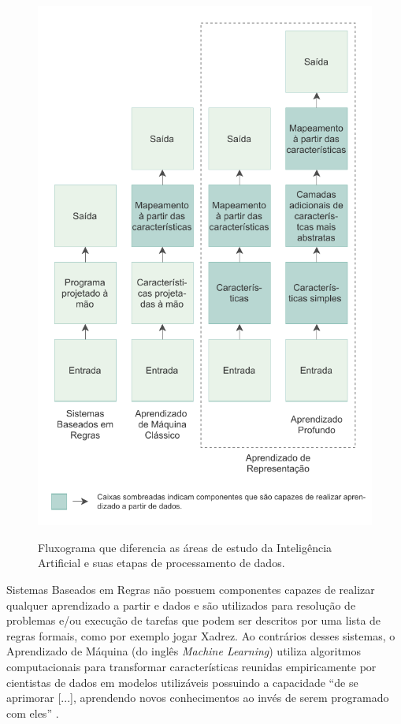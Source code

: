 \begin{figure}[h!] %
  \centering
  \caption{Fluxograma que diferencia as áreas de estudo da Inteligência Artificial e suas etapas de processamento de dados. }
  \includegraphics[scale=1.1]{img/img-fundamentacao-fluxograma.pdf}
  \label{fig:fund-fluxograma}
\end{figure}

Sistemas Baseados em Regras não possuem componentes capazes de realizar qualquer aprendizado a partir e dados \cite{ref:Goodfellow-Bengio-Courville} e são utilizados para resolução de problemas e/ou execução de tarefas que podem ser descritos por uma lista de regras formais, como por exemplo jogar Xadrez. Ao contrários desses sistemas, o Aprendizado de Máquina (do inglês \textit{Machine Learning}) utiliza algoritmos computacionais para transformar características reunidas empiricamente por cientistas de dados em modelos utilizáveis \cite{ref:Edgar-Manz} \cite{ref:Robins} possuindo a capacidade ``de se aprimorar [...], aprendendo novos conhecimentos ao invés de serem programado com eles'' \cite{ref:Woolf}.

